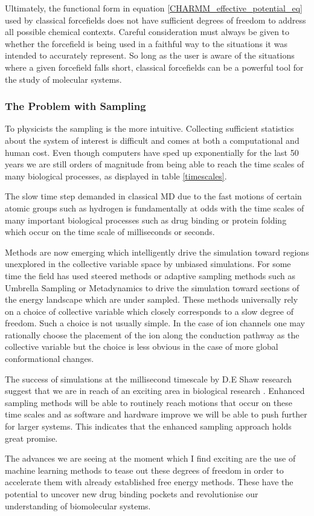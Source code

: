 Ultimately, the functional form in equation \ref{CHARMM_effective_potential_eq} used by classical forcefields does not have sufficient degrees of freedom to address all possible chemical contexts. Careful consideration must always be given to whether the forcefield is being used in a faithful way to the situations it was intended to accurately represent. So long as the user is aware of the situations where a given forcefield falls short, classical forcefields can be a powerful tool for the study of molecular systems.

\subsubsection{The Problem with Sampling}

To physicists the sampling is the more intuitive. Collecting sufficient statistics about the system of interest is difficult and comes at both a computational and human cost. Even though computers have sped up exponentially for the last 50 years we are still orders of magnitude from being able to reach the time scales of many biological processes, as displayed in table \ref{timescales}.

The slow time step demanded in classical MD due to the fast motions of certain atomic groups such as hydrogen is fundamentally at odds with the time scales of many important biological processes such as drug binding or protein folding which occur on the time scale of  milliseconds or seconds.  

Methods are now emerging which intelligently drive the simulation toward regions unexplored in the collective variable space by unbiased simulations. For some time the field has used steered methods or adaptive sampling methods such as Umbrella Sampling or Metadynamics to drive the simulation toward sections of the energy landscape which are under sampled. These methods universally rely on a choice of collective variable which closely corresponds to a slow degree of freedom. Such a choice is not usually simple. In the case of ion channels one may rationally choose the placement of the ion along the conduction pathway as the collective variable but the choice is less obvious in the case of more global conformational changes.

The success of simulations at the millisecond timescale by D.E Shaw research suggest that we are in reach of an exciting area in biological research \cite{lindorff-larsen2016}. Enhanced sampling methods will be able to routinely reach motions that occur on these time scales and as software and hardware improve we will be able to push further for larger systems. This indicates that the enhanced sampling approach holds great promise.

The advances we are seeing at the moment which I find exciting are the use of machine learning methods to tease out these degrees of freedom in order to accelerate them with already established free energy methods. These have the potential to uncover new drug binding pockets and revolutionise our understanding of biomolecular systems. 


